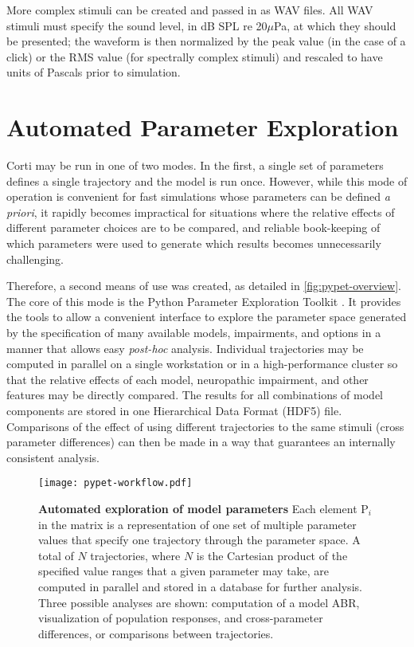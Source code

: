 More complex stimuli can be created and passed in as WAV files.  All WAV stimuli must specify the sound level, in dB SPL re 20$\mu$Pa, at which they should be presented; the waveform is then normalized by the peak value (in the case of a click) or the RMS value (for spectrally complex stimuli) and rescaled to have units of Pascals prior to simulation.
\section{Automated Parameter Exploration} %
\label{sec:automated_parameter_exploration}
Corti may be run in one of two modes.  In the first, a single set of parameters defines a single trajectory and the model is run once.   However, while this mode of operation is convenient for fast simulations whose parameters can be defined \emph{a priori}, it rapidly becomes impractical for situations where the relative effects of different parameter choices are to be compared, and reliable book-keeping of which parameters were used to generate which results becomes unnecessarily challenging.

Therefore, a second means of use was created, as detailed in \autoref{fig:pypet-overview}. The core of this mode is the Python Parameter Exploration Toolkit \citep{Meyer2016Pypet}. It provides the tools to allow a convenient interface to explore the parameter space generated by the specification of many available models, impairments, and options in a manner that allows easy \emph{post-hoc} analysis. Individual trajectories may be computed in parallel on a single workstation or in a high-performance cluster so that the relative effects of each model, neuropathic impairment, and other features may be directly compared.  The results for all combinations of model components are stored in one Hierarchical Data Format (HDF5) file.  Comparisons of the effect of using different trajectories to the same stimuli (cross parameter differences) can then be made in a way that guarantees an internally consistent analysis.

\begin{figure}[htbp]
	\centering
	\texttt{[image: pypet-workflow.pdf]}
	\caption[Automated Exploration of Model Parameters]{\textbf{Automated exploration of model parameters} Each element P$_i$ in the matrix is a representation of one set of multiple parameter values that specify one trajectory through the parameter space.  A total of $N$ trajectories, where $N$ is the Cartesian product of the specified value ranges that a given parameter may take, are computed in parallel and stored in a database for further analysis.  Three possible analyses are shown: computation of a model ABR, visualization of population responses, and cross-parameter differences, or comparisons between trajectories. }
	\label{fig:pypet-overview}
\end{figure}
